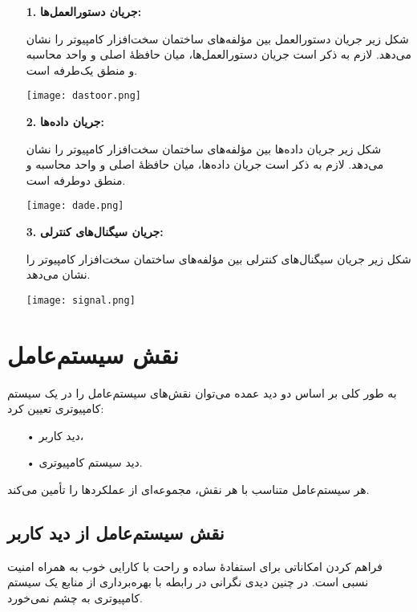 \documentclass{article}
\begin{document}
\begin{enumerate}
    \item[\textbf{1.}]\textbf{جریان دستورالعمل‌ها:}
    
    شکل زیر جریان دستورالعمل بین مؤلفه‌های ساختمان سخت‌افزار کامپیوتر را نشان می‌دهد.
لازم به ذکر است جریان دستورالعمل‌ها، میان حافظۀ اصلی و واحد محاسبه و منطق یک‌طرفه است.

\begin{center}
\texttt{[image: dastoor.png]}   
\end{center}

    
\item[\textbf{2.}] \textbf{جریان داده‌ها:}

    شکل زیر جریان داده‌ها بین مؤلفه‌های ساختمان سخت‌افزار کامپیوتر را نشان می‌دهد.
لازم به ذکر است جریان داده‌ها، میان حافظۀ اصلی و واحد محاسبه و منطق دوطرفه است.

\begin{center}

\texttt{[image: dade.png]}   
\end{center}

\item[\textbf{3.}] \textbf{جریان سیگنال‌های کنترلی:}

    شکل زیر جریان سیگنال‌های کنترلی بین مؤلفه‌های ساختمان سخت‌افزار کامپیوتر را نشان می‌دهد.

\begin{center}

\texttt{[image: signal.png]}   
\end{center}

\end{enumerate}
\section{نقش سیستم‌عامل}
به طور کلی بر اساس دو دید عمده می‌توان نقش‌های سیستم‌عامل را در یک سیستم کامپیوتری تعیین کرد:
\begin{enumerate}
    \item[•]دید کاربر،
    \item[•]دید سیستم کامپیوتری.
\end{enumerate}
هر سیستم‌عامل متناسب با هر نقش، مجموعه‌ای از عملکردها
 را تأمین می‌کند.

\subsection{نقش سیستم‌عامل از دید کاربر}
فراهم کردن امکاناتی برای استفادۀ ساده و راحت با کارایی خوب به همراه امنیت نسبی است. در چنین دیدی نگرانی در رابطه با بهره‌برداری از منابع یک سیستم کامپیوتری به چشم نمی‌خورد.
\end{document}
